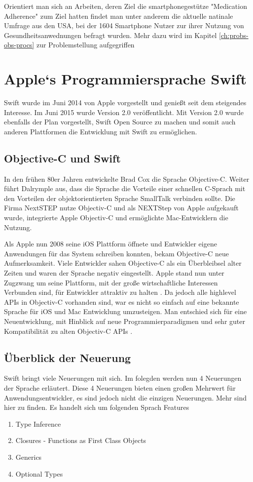 Orientiert man sich an Arbeiten, deren Ziel die smartphonegestütze "Medication Adherence" zum Ziel hatten findet man unter anderem die aktuelle natinale Umfrage \cite{Krebs-P:2015aa} aus den USA, bei der 1604 Smartphone Nutzer zur ihrer Nutzung von Gesundheitsanwednungen befragt wurden. Mehr dazu wird im Kapitel \ref{ch:probs-obs-procs} zur Problemstellung  aufgegriffen
\section{Apple`s Programmiersprache Swift}
Swift wurde im Juni 2014 von Apple vorgestellt und genießt seit dem steigendes Interesse. Im Juni 2015 wurde Version 2.0 veröffentlicht. Mit Version 2.0 wurde ebenfalls der Plan vorgestellt, Swift Open Source zu machen und somit auch anderen Plattformen die Entwicklung mit Swift zu ermöglichen.

\subsection{Objective-C und Swift}
In den frühen 80er Jahren entwickelte Brad Cox die Sprache Objective-C\cite{Dalrymple:2009aa}. Weiter führt Dalrymple aus, dass die Sprache  die Vorteile einer schnellen C-Sprach mit den Vorteilen der objektorientierten Sprache SmallTalk verbinden sollte. Die Firma NextSTEP nutze Objectiv-C und als NEXTStep von Apple aufgekauft wurde, integrierte Apple Objectiv-C und ermöglichte Mac-Entwicklern die Nutzung.

 Als Apple nun 2008 seine iOS Plattform öffnete und Entwickler eigene Anwendungen für das System schreiben konnten, bekam Objective-C neue Aufmerksamkeit. Viele Entwickler sahen Objective-C als ein Überbleibsel alter Zeiten und waren der Sprache negativ eingestellt. Apple stand nun unter Zugzwang um seine Plattform, mit der große wirtschaftliche Interessen Verbunden sind, für Entwickler attraktiv zu halten \cite{tre}. Da jedoch alle highlevel APIs in Objectiv-C vorhanden sind, war es nicht so einfach auf eine bekannte Sprache für iOS und Mac Entwicklung umzusteigen. Man entschied sich für eine Neuentwicklung, mit Hinblick auf neue Programmierparadigmen und sehr guter Kompatibilität zu alten Objectiv-C APIs \cite{tre}.

\subsection{Überblick der Neuerung}
Swift bringt viele Neuerungen mit sich. Im folegden werden nun 4 Neuerungen der Sprache erläutert. Diese 4 Neuerungen bieten einen großen Mehrwert für Anwendungsentwickler, es sind jedoch nicht die einzigen Neuerungen. Mehr sind hier\cite{tre} zu finden. Es handelt sich um folgenden Sprach Features
\begin{enumerate}
\item Type Inference
\item Closures - Functions as First Class Objects
\item Generics
\item Optional Types
\end{enumerate}

